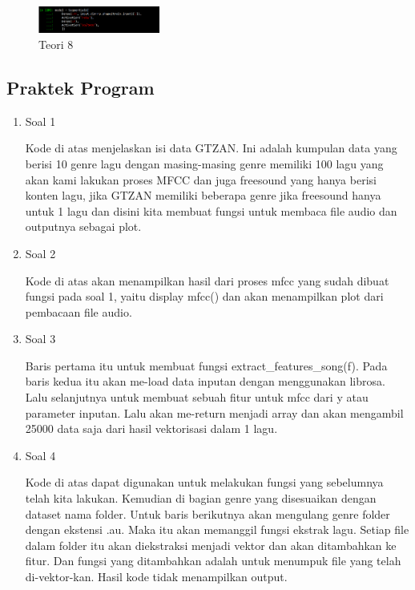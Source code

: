 \begin{enumerate}
	\begin{figure}[H]
	\centering
		\includegraphics[width=4cm]{figures/1174005/tugas6/materi/teori8.PNG}
		\caption{Teori 8}
	\end{figure}
\end{enumerate}

\subsection{Praktek Program}
\begin{enumerate}
	\item Soal 1
	\hfill\break
	
	Kode di atas menjelaskan isi data GTZAN. Ini adalah kumpulan data yang berisi 10 genre lagu dengan masing-masing genre memiliki 100 lagu yang akan kami lakukan proses MFCC dan juga freesound yang hanya berisi konten lagu, jika GTZAN memiliki beberapa genre jika freesound hanya untuk 1 lagu dan disini kita membuat fungsi untuk membaca file audio dan outputnya sebagai plot.

	\item Soal 2
	\hfill\break
	
	Kode di atas akan menampilkan hasil dari proses mfcc yang sudah dibuat fungsi pada soal 1, yaitu display mfcc() dan akan menampilkan plot dari pembacaan file audio. 

	\item Soal 3
	\hfill\break
	
	Baris pertama itu untuk membuat fungsi extract\_features\_song(f). Pada baris kedua itu akan me-load data inputan dengan menggunakan librosa. Lalu selanjutnya untuk membuat sebuah fitur untuk mfcc dari y atau parameter inputan. Lalu akan me-return menjadi array dan akan mengambil 25000 data saja dari hasil vektorisasi dalam 1 lagu. 

	\item Soal 4
	\hfill\break
	
	Kode di atas dapat digunakan untuk melakukan fungsi yang sebelumnya telah kita lakukan. Kemudian di bagian genre yang disesuaikan dengan dataset nama folder. Untuk baris berikutnya akan mengulang genre folder dengan ekstensi .au. Maka itu akan memanggil fungsi ekstrak lagu. Setiap file dalam folder itu akan diekstraksi menjadi vektor dan akan ditambahkan ke fitur. Dan fungsi yang ditambahkan adalah untuk menumpuk file yang telah di-vektor-kan. Hasil kode tidak menampilkan output. 


\end{enumerate}
